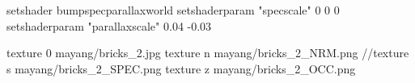setshader bumpspecparallaxworld
setshaderparam "specscale" 0 0 0
setshaderparam "parallaxscale" 0.04 -0.03

texture 0 mayang/bricks_2.jpg
texture n mayang/bricks_2_NRM.png
//texture s mayang/bricks_2_SPEC.png
texture z mayang/bricks_2_OCC.png

